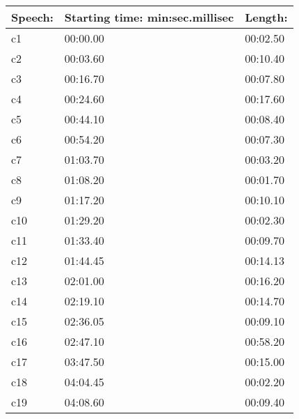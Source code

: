 \documentclass[a4paper,10pt]{report}
\begin{document}
\begin{longtable}[|c|]{|l|l|l|}
    Speech:                         & Starting time: min:sec.millisec & Length:  \\ \hline
    c1                              & 00:00.00                        & 00:02.50 \\ \hline
    c2                              & 00:03.60                        & 00:10.40 \\ \hline
    c3                              & 00:16.70                        & 00:07.80 \\ \hline
    c4                              & 00:24.60                        & 00:17.60 \\ \hline
    c5                              & 00:44.10                        & 00:08.40 \\ \hline
    c6                              & 00:54.20                        & 00:07.30 \\ \hline
    c7                              & 01:03.70                        & 00:03.20 \\ \hline
    c8                              & 01:08.20                        & 00:01.70 \\ \hline
    c9                              & 01:17.20                        & 00:10.10 \\ \hline
    c10                             & 01:29.20                        & 00:02.30 \\ \hline
    c11                             & 01:33.40                        & 00:09.70 \\ \hline
    c12                             & 01:44.45                        & 00:14.13 \\ \hline
    c13                             & 02:01.00                        & 00:16.20 \\ \hline
    c14                             & 02:19.10                        & 00:14.70 \\ \hline
    c15                             & 02:36.05                        & 00:09.10 \\ \hline
    c16                             & 02:47.10                        & 00:58.20 \\ \hline
    c17                             & 03:47.50                        & 00:15.00 \\ \hline
    c18                             & 04:04.45                        & 00:02.20 \\ \hline
    c19                             & 04:08.60                        & 00:09.40 \\ \hline

\end{longtable}
\end{document}

